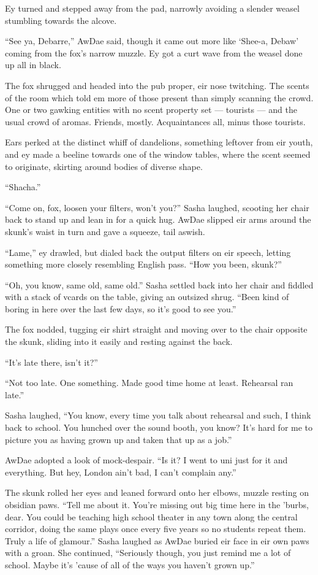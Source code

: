 Ey turned and stepped away from the pad, narrowly avoiding a slender weasel stumbling towards the alcove.

``See ya, Debarre,'' AwDae said, though it came out more like `Shee-a, Debaw' coming from the fox's narrow muzzle. Ey got a curt wave from the weasel done up all in black.

The fox shrugged and headed into the pub proper, eir nose twitching. The scents of the room which told em more of those present than simply scanning the crowd. One or two gawking entities with no scent property set --- tourists --- and the usual crowd of aromas. Friends, mostly. Acquaintances all, minus those tourists.

Ears perked at the distinct whiff of dandelions, something leftover from eir youth, and ey made a beeline towards one of the window tables, where the scent seemed to originate, skirting around bodies of diverse shape.

``Shacha.''

``Come on, fox, loosen your filters, won't you?'' Sasha laughed, scooting her chair back to stand up and lean in for a quick hug. AwDae slipped eir arms around the skunk's waist in turn and gave a squeeze, tail aswish.

``Lame,'' ey drawled, but dialed back the output filters on eir speech, letting something more closely resembling English pass. ``How you been, skunk?''

``Oh, you know, same old, same old.'' Sasha settled back into her chair and fiddled with a stack of vcards on the table, giving an outsized shrug. ``Been kind of boring in here over the last few days, so it's good to see you.''

The fox nodded, tugging eir shirt straight and moving over to the chair opposite the skunk, sliding into it easily and resting against the back.

``It's late there, isn't it?''

``Not too late. One something. Made good time home at least. Rehearsal ran late.''

Sasha laughed, ``You know, every time you talk about rehearsal and such, I think back to school. You hunched over the sound booth, you know? It's hard for me to picture you as having grown up and taken that up as a job.''

AwDae adopted a look of mock-despair. ``Is it? I went to uni just for it and everything. But hey, London ain't bad, I can't complain any.''

The skunk rolled her eyes and leaned forward onto her elbows, muzzle resting on obsidian paws. ``Tell me about it. You're missing out big time here in the 'burbs, dear. You could be teaching high school theater in any town along the central corridor, doing the same plays once every five years so no students repeat them. Truly a life of glamour.'' Sasha laughed as AwDae buried eir face in eir own paws with a groan. She continued, ``Seriously though, you just remind me a lot of school. Maybe it's 'cause of all of the ways you haven't grown up.''


